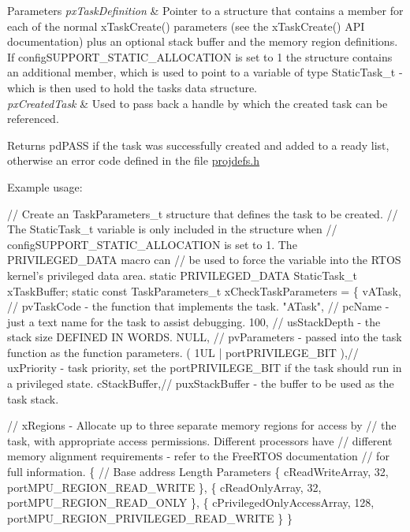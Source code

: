 \begin{DoxyParams}{Parameters}
{\em px\+Task\+Definition} & Pointer to a structure that contains a member for each of the normal x\+Task\+Create() parameters (see the x\+Task\+Create() A\+PI documentation) plus an optional stack buffer and the memory region definitions. If config\+S\+U\+P\+P\+O\+R\+T\+\_\+\+S\+T\+A\+T\+I\+C\+\_\+\+A\+L\+L\+O\+C\+A\+T\+I\+ON is set to 1 the structure contains an additional member, which is used to point to a variable of type Static\+Task\+\_\+t -\/ which is then used to hold the task\textquotesingle{}s data structure.\\
\hline
{\em px\+Created\+Task} & Used to pass back a handle by which the created task can be referenced.\\
\hline
\end{DoxyParams}
\begin{DoxyReturn}{Returns}
pd\+P\+A\+SS if the task was successfully created and added to a ready list, otherwise an error code defined in the file \hyperlink{projdefs_8h}{projdefs.\+h}
\end{DoxyReturn}
Example usage\+: 
\begin{DoxyPre}
// Create an TaskParameters\_t structure that defines the task to be created.
// The StaticTask\_t variable is only included in the structure when
// configSUPPORT\_STATIC\_ALLOCATION is set to 1.  The PRIVILEGED\_DATA macro can
// be used to force the variable into the RTOS kernel's privileged data area.
static PRIVILEGED\_DATA StaticTask\_t xTaskBuffer;
static const TaskParameters\_t xCheckTaskParameters =
\{
    vATask,     // pvTaskCode - the function that implements the task.
    "ATask",    // pcName - just a text name for the task to assist debugging.
    100,        // usStackDepth - the stack size DEFINED IN WORDS.
    NULL,       // pvParameters - passed into the task function as the function parameters.
    ( 1UL | portPRIVILEGE\_BIT ),// uxPriority - task priority, set the portPRIVILEGE\_BIT if the task should run in a privileged state.
    cStackBuffer,// puxStackBuffer - the buffer to be used as the task stack.\end{DoxyPre}



\begin{DoxyPre}    // xRegions - Allocate up to three separate memory regions for access by
    // the task, with appropriate access permissions.  Different processors have
    // different memory alignment requirements - refer to the FreeRTOS documentation
    // for full information.
    \{
        // Base address                 Length  Parameters
        \{ cReadWriteArray,              32,     portMPU\_REGION\_READ\_WRITE \},
        \{ cReadOnlyArray,               32,     portMPU\_REGION\_READ\_ONLY \},
        \{ cPrivilegedOnlyAccessArray,   128,    portMPU\_REGION\_PRIVILEGED\_READ\_WRITE \}
    \}\end{DoxyPre}



